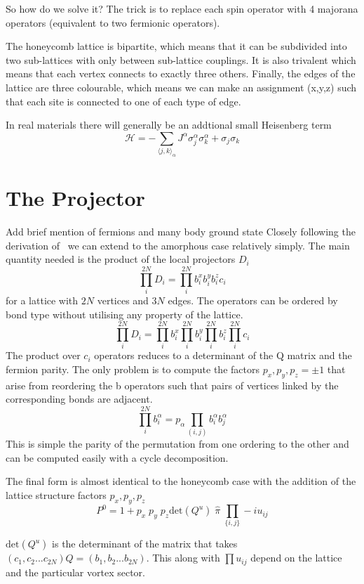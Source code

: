 So how do we solve it? The trick is to replace each spin operator with 4 majorana operators (equivalent to two fermionic operators). 
 
 
The honeycomb lattice is bipartite, which means that it can be subdivided into two sub-lattices with only between sub-lattice couplings. It is also trivalent which means that each vertex connects to exactly three others. Finally, the edges of the lattice are three colourable, which means we can make an assignment (x,y,z) such that each site is connected to one of each type of edge. 

In real materials there will generally be an addtional small Heisenberg term
\begin{equation}
    \label{eqn:kitham}
    \mathcal{H} =  - \sum_{\langle j,k\rangle_\alpha} J^{\alpha}\sigma_j^{\alpha}\sigma_k^{\alpha} + \sigma_j\sigma_k
\end{equation}

\section{The Projector} \label{apx:projector}
{\color{red} Add brief mention of fermions and many body ground state}
Closely following the derivation of~\cite{pedrocchiPhysicalSolutionsKitaev2011} we can extend to the amorphous case relatively simply. The main quantity needed is the product of the local projectors \(D_i\)
\[\prod_i^{2N} D_i = \prod_i^{2N} b^x_i b^y_i b^z_i c_i \]
for a lattice with \(2N\) vertices and \(3N\) edges. The operators can be ordered by bond type without utilising any property of the lattice.
\[\prod_i^{2N} D_i = \prod_i^{2N} b^x_i \prod_i^{2N} b^y_i \prod_i^{2N} b^z_i \prod_i^{2N} c_i\]
The product over \(c_i\) operators reduces to a determinant of the Q matrix and the fermion parity. The only problem is to compute the factors \(p_x,p_y,p_z = \pm1\) that arise from reordering the b operators such that pairs of vertices linked by the corresponding bonds are adjacent.
\[\prod_i^{2N} b^\alpha_i = p_\alpha \prod_{(i,j)}b^\alpha_i b^\alpha_j\]
This is simple the parity of the permutation from one ordering to the other and can be computed easily with a cycle decomposition.

The final form is almost identical to the honeycomb case with the addition of the lattice structure factors \(p_x,p_y,p_z\)
\[P^0 = 1 + p_x\;p_y\;p_z \mathrm{det}(Q^u) \; \hat{\pi} \; \prod_{\{i,j\}} -iu_{ij}\] 

\(\mathrm{det}(Q^u)\) is the determinant of the matrix that takes \((c_1, c_2... c_{2N}) Q = (b_1, b_2... b_{2N})\). This along with \(\prod u_{ij}\) depend on the lattice and the particular vortex sector. 

